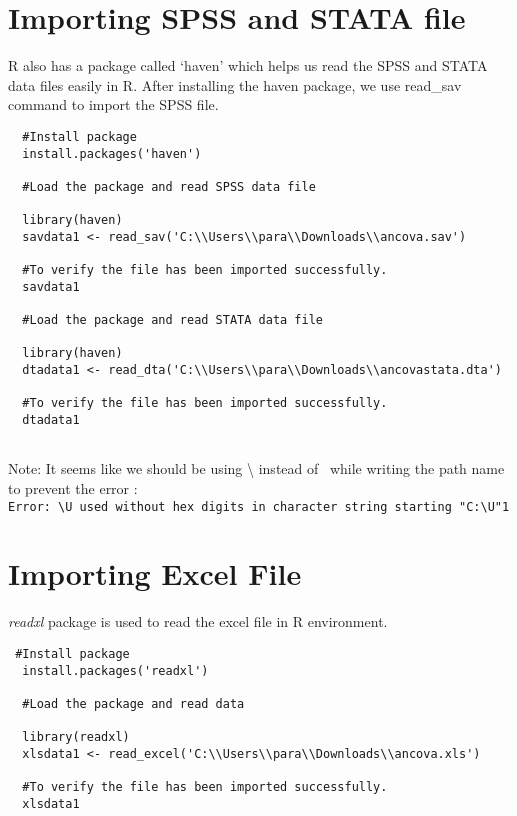 \documentclass[
]{book}
\begin{document}
\hypertarget{importing-spss-and-stata-file}{%
\section{Importing SPSS and STATA file}\label{importing-spss-and-stata-file}}

R also has a package called `haven' which helps us read the SPSS and STATA data files easily in R. After installing the haven package, we use read\_sav command to import the SPSS file.

\begin{verbatim}
  #Install package
  install.packages('haven')
  
  #Load the package and read SPSS data file
  
  library(haven)
  savdata1 <- read_sav('C:\\Users\\para\\Downloads\\ancova.sav')
  
  #To verify the file has been imported successfully.
  savdata1
  
  #Load the package and read STATA data file
  
  library(haven)
  dtadata1 <- read_dta('C:\\Users\\para\\Downloads\\ancovastata.dta')
  
  #To verify the file has been imported successfully.
  dtadata1
  
\end{verbatim}

Note: It seems like we should be using \textbackslash{} instead of ~while writing the path name to prevent the error : \texttt{Error:\ \textquotesingle{}\textbackslash{}U\textquotesingle{}\ used\ without\ hex\ digits\ in\ character\ string\ starting\ "\textquotesingle{}C:\textbackslash{}U"1}

\hypertarget{importing-excel-file}{%
\section{Importing Excel File}\label{importing-excel-file}}

\emph{readxl} package is used to read the excel file in R environment.

\begin{verbatim}
 #Install package
  install.packages('readxl')
  
  #Load the package and read data
  
  library(readxl)
  xlsdata1 <- read_excel('C:\\Users\\para\\Downloads\\ancova.xls')
  
  #To verify the file has been imported successfully.
  xlsdata1
  
\end{verbatim}
\end{document}

